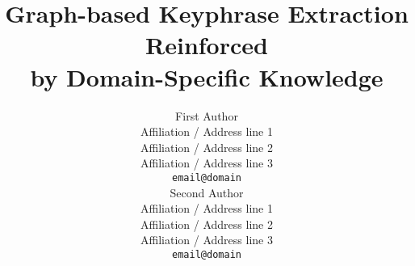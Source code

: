 \documentclass[11pt]{article}
\title{Graph-based Keyphrase Extraction Reinforced\\by Domain-Specific Knowledge}
\author{First Author \\
  Affiliation / Address line 1 \\
  Affiliation / Address line 2 \\
  Affiliation / Address line 3 \\
  {\tt email@domain} \\\And
  Second Author \\
  Affiliation / Address line 1 \\
  Affiliation / Address line 2 \\
  Affiliation / Address line 3 \\
  {\tt email@domain} \\}
\date{}
\begin{document}
  \maketitle

  \begin{abstract}
  \end{abstract}

  


  
  
\end{document}
